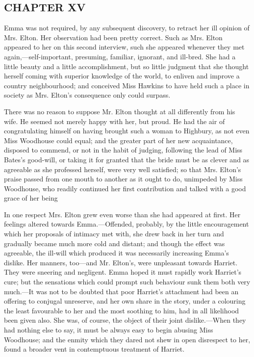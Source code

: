 \subsection[chapter-xv-1]{\useURL[url34][][][]\from[url34]CHAPTER XV}

Emma was not required, by any subsequent discovery, to retract her ill opinion of Mrs. Elton. Her observation had been pretty correct. Such as Mrs. Elton appeared to her on this second interview, such she appeared whenever they met again,---self-important, presuming, familiar, ignorant, and ill-bred. She had a little beauty and a little accomplishment, but so little judgment that she thought herself coming with superior knowledge of the world, to enliven and improve a country neighbourhood; and conceived Miss Hawkins to have held such a place in society as Mrs. Elton's consequence only could surpass.

There was no reason to suppose Mr. Elton thought at all differently from his wife. He seemed not merely happy with her, but proud. He had the air of congratulating himself on having brought such a woman to Highbury, as not even Miss Woodhouse could equal; and the greater part of her new acquaintance, disposed to commend, or not in the habit of judging, following the lead of Miss Bates's good-will, or taking it for granted that the bride must be as clever and as agreeable as she professed herself, were very well satisfied; so that Mrs. Elton's praise passed from one mouth to another as it ought to do, unimpeded by Miss Woodhouse, who readily continued her first contribution and talked with a good grace of her being 

In one respect Mrs. Elton grew even worse than she had appeared at first. Her feelings altered towards Emma.---Offended, probably, by the little encouragement which her proposals of intimacy met with, she drew back in her turn and gradually became much more cold and distant; and though the effect was agreeable, the ill-will which produced it was necessarily increasing Emma's dislike. Her manners, too---and Mr. Elton's, were unpleasant towards Harriet. They were sneering and negligent. Emma hoped it must rapidly work Harriet's cure; but the sensations which could prompt such behaviour sunk them both very much.---It was not to be doubted that poor Harriet's attachment had been an offering to conjugal unreserve, and her own share in the story, under a colouring the least favourable to her and the most soothing to him, had in all likelihood been given also. She was, of course, the object of their joint dislike.---When they had nothing else to say, it must be always easy to begin abusing Miss Woodhouse; and the enmity which they dared not shew in open disrespect to her, found a broader vent in contemptuous treatment of Harriet.


